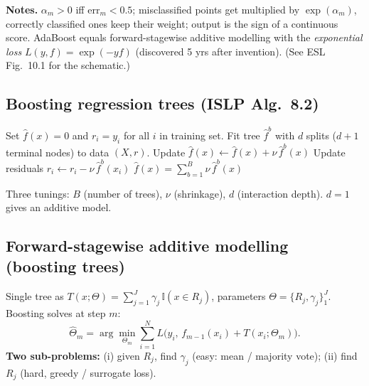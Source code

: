 \textbf{Notes.} $\alpha_m>0$ iff $\text{err}_m<0.5$; misclassified points get multiplied by $\exp(\alpha_m)$, correctly classified ones keep their weight; output is the sign of a continuous score. AdaBoost equals forward-stagewise additive modelling with the \emph{exponential loss} $L(y,f)=\exp(-yf)$ (discovered 5 yrs after invention).
(See ESL Fig.\ 10.1 for the schematic.)

\subsection{Boosting regression trees (ISLP Alg.\ 8.2)}
\begin{algorithm}[H]
\caption{Boosting for regression trees (ISLP Alg.\ 8.2)}
\begin{algorithmic}[1]
\State Set $\hat f(x)=0$ and $r_i=y_i$ for all $i$ in training set.
  \State Fit tree $\hat f^{b}$ with $d$ splits ($d{+}1$ terminal nodes) to data $(X,r)$.
  \State Update $\hat f(x) \gets \hat f(x) + \nu\, \hat f^{b}(x)$
  \State Update residuals $r_i \gets r_i - \nu\, \hat f^{b}(x_i)$
\EndFor
\State \Return $\hat f(x) = \sum_{b=1}^B \nu\, \hat f^{b}(x)$
\end{algorithmic}
\end{algorithm}
Three tunings: $B$ (number of trees), $\nu$ (shrinkage), $d$ (interaction depth). $d=1$ gives an additive model.

\subsection{Forward-stagewise additive modelling (boosting trees)}
Single tree as $T(x;\Theta)=\sum_{j=1}^J \gamma_j\, \mathbb{I}(x\in R_j)$, parameters $\Theta=\{R_j,\gamma_j\}_1^J$. Boosting solves at step $m$:
\[ \hat\Theta_m = \arg\min_{\Theta_m} \sum_{i=1}^N L\!\big(y_i,\, f_{m-1}(x_i) + T(x_i;\Theta_m)\big). \]
\textbf{Two sub-problems:} (i) given $R_j$, find $\gamma_j$ (easy: mean / majority vote); (ii) find $R_j$ (hard, greedy / surrogate loss).

